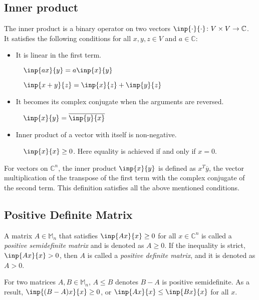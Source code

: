 \documentclass[twofold]{article}
\newcommand*\conj[1]{\overline{#1}}
\newcommand*\trp[1]{#1^T}
\theoremstyle{plain}
\theoremstyle{definition}
\theoremstyle{remark}
\begin{document}
\subsection{Inner product}

The inner product is a binary operator on two vectors \(\inp{\cdot}{\cdot} \colon V  \times  V \to \mathbb{C}\). It  satisfies the following conditions for all \(x, y, z \in V\) and \(a \in \mathbb{C}\):

\begin{itemize}
\item It is linear in the first term. 

\(\quad \inp{ax}{y} = a \inp{x}{y}\)
 
\(\quad \inp{x + y}{z} = \inp{x}{z} + \inp{y}{z}\)

\item It becomes its complex conjugate when the arguments are reversed.

\(\quad \inp{x}{y} = \conj{\inp{y}{x}}\)

\item Inner product of a vector with itself is non-negative. 

\(\quad \inp{x}{x} \ge 0\). Here equality is achieved if and only if \(x = 0\).
\end{itemize}

For vectors on \(\mathbb{C}^n\), the inner product \(\inp{x}{y}\) is defined as \(\trp{x} \conj{y}\), the vector multiplication of the transpose of the first term with the complex conjugate of the second term. This definition satisfies all the above mentioned conditions.

\subsection{Positive Definite Matrix}

A matrix \(A\in \mathbb{M}_n\) that satisfies \(\inp{Ax}{x} \ge 0\) for all \(x \in \mathbb{C}^n\) is called a {\em positive semidefinite matrix} and is denoted as \(A \ge 0\). If the inequality is strict, \(\inp{Ax}{x} > 0\), then \(A\) is called a {\em positive definite matrix}, and it is denoted as \(A > 0\). 

For two matrices \(A, B \in \mathbb{M}_n\), \(A \le B\) denotes \(B - A\) is positive semidefinite. As a result, \(\inp{(B - A)x}{x} \ge 0\), or \(\inp{Ax}{x} \le \inp{Bx}{x}\) for all \(x\).
\end{document}
